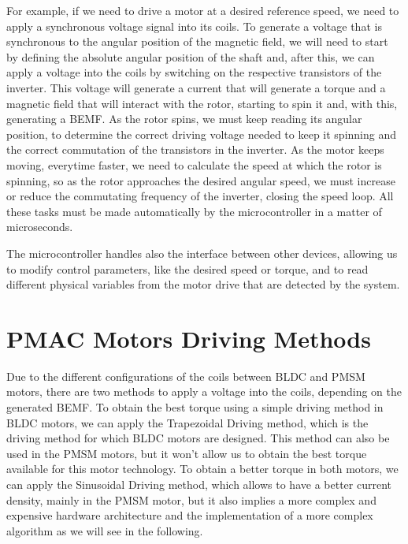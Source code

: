 For example, if we need to drive a motor at a desired reference speed, we need to apply a synchronous voltage signal into its coils. To generate a voltage that is synchronous to the angular position of the magnetic field, we will need to start by defining the absolute angular position of the shaft and, after this, we can apply a voltage into the coils by switching on the respective transistors of the inverter. This voltage will generate a current that will generate a torque and a magnetic field that will interact with the rotor, starting to spin it and, with this, generating a \ac{BEMF}. As the rotor spins, we must keep reading its angular position, to determine the correct driving voltage needed to keep it spinning and the correct commutation of the transistors in the inverter. As the motor keeps moving, everytime faster, we need to calculate the speed at which the rotor is spinning, so as the rotor approaches the desired angular speed, we must increase or reduce the commutating frequency of the inverter, closing the speed loop. All these tasks must be made automatically by the microcontroller in a matter of microseconds.

The microcontroller handles also the interface between other devices, allowing us to modify control parameters, like the desired speed or torque, and to read different physical variables from the motor drive that are detected by the system.

\section{PMAC Motors Driving Methods}\label{section:driving_methods}

Due to the different configurations of the coils between \ac{BLDC} and \ac{PMSM} motors, there are two methods to apply a voltage into the coils, depending on the generated \ac{BEMF}. To obtain the best torque using a simple driving method in \ac{BLDC} motors, we can apply the Trapezoidal Driving method, which is the driving method for which \ac{BLDC} motors are designed. This method can also be used in the \ac{PMSM} motors, but it won't allow us to obtain the best torque available for this motor technology. To obtain a better torque in both motors, we can apply the Sinusoidal Driving method, which allows to have a better current density, mainly in the \ac{PMSM} motor, but it also implies a more complex and expensive hardware architecture and the implementation of a more complex algorithm as we will see in the following. 


